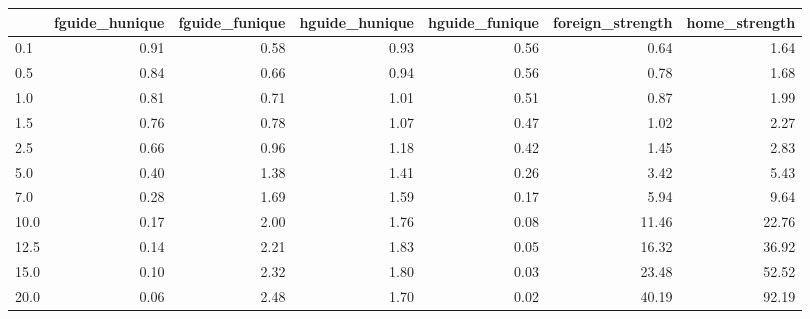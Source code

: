\begin{tabular}{lrrrrrr}
\toprule
 & fguide_hunique & fguide_funique & hguide_hunique & hguide_funique & foreign_strength & home_strength \\
\midrule
0.1 & 0.91 & 0.58 & 0.93 & 0.56 & 0.64 & 1.64 \\
0.5 & 0.84 & 0.66 & 0.94 & 0.56 & 0.78 & 1.68 \\
1.0 & 0.81 & 0.71 & 1.01 & 0.51 & 0.87 & 1.99 \\
1.5 & 0.76 & 0.78 & 1.07 & 0.47 & 1.02 & 2.27 \\
2.5 & 0.66 & 0.96 & 1.18 & 0.42 & 1.45 & 2.83 \\
5.0 & 0.40 & 1.38 & 1.41 & 0.26 & 3.42 & 5.43 \\
7.0 & 0.28 & 1.69 & 1.59 & 0.17 & 5.94 & 9.64 \\
10.0 & 0.17 & 2.00 & 1.76 & 0.08 & 11.46 & 22.76 \\
12.5 & 0.14 & 2.21 & 1.83 & 0.05 & 16.32 & 36.92 \\
15.0 & 0.10 & 2.32 & 1.80 & 0.03 & 23.48 & 52.52 \\
20.0 & 0.06 & 2.48 & 1.70 & 0.02 & 40.19 & 92.19 \\
\bottomrule
\end{tabular}
